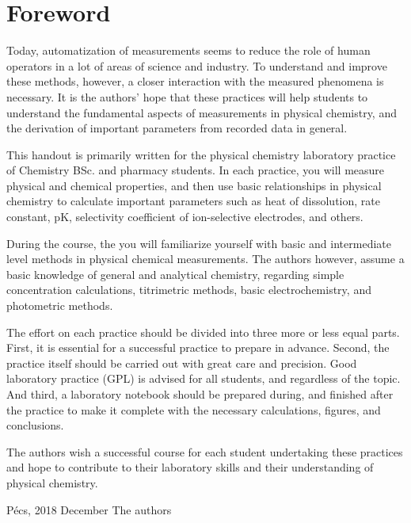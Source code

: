 \section{Foreword}

Today, automatization of measurements seems to reduce the role of human operators in a lot of areas of science and industry. To understand and improve these methods, however, a closer interaction with the measured phenomena is necessary. It is the authors' hope that these practices will help students to understand the fundamental aspects of measurements in physical chemistry, and the derivation of important parameters from recorded data in general.

This handout is primarily written for the physical chemistry laboratory practice of Chemistry BSc. and pharmacy students. In each practice, you will measure physical and chemical properties, and then use basic relationships in physical chemistry to calculate important parameters such as heat of dissolution, rate constant, pK, selectivity coefficient of ion-selective electrodes, and others.

During the course, the you will familiarize yourself with basic and intermediate level methods in physical chemical measurements. The authors however, assume a basic knowledge of general and analytical chemistry, regarding simple concentration calculations, titrimetric methods, basic electrochemistry, and photometric methods.

The effort on each practice should be divided into three more or less equal parts. First, it is essential for a successful practice to prepare in advance. Second, the practice itself should be carried out with great care and precision. Good laboratory practice (GPL) is advised for all students, and regardless of the topic. And third, a laboratory notebook should be prepared during, and finished after the practice to make it complete with the necessary calculations, figures, and conclusions.

The authors wish a successful course for each student undertaking these practices and hope to contribute to their laboratory skills and their understanding of physical chemistry.

\vspace{2 cm}

Pécs, 2018 December \hfill The authors
